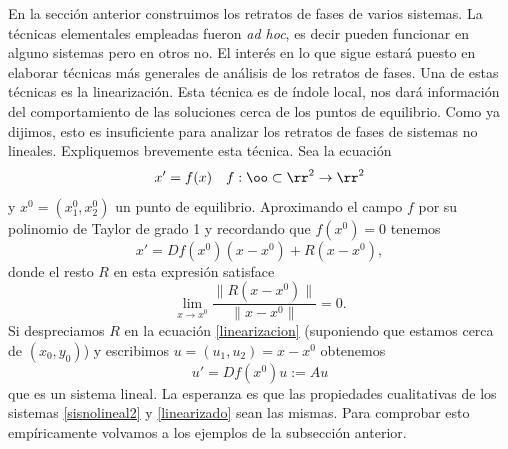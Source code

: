 En la sección anterior construimos los retratos de
fases de varios sistemas. La técnicas elementales empleadas fueron
\emph{ad hoc}, es decir pueden funcionar en alguno sistemas pero
en otros no. El interés en lo que sigue estará puesto en elaborar
técnicas más generales de análisis de los retratos de fases. Una
de estas técnicas es la linearización. Esta técnica es de índole
local, nos dará información del comportamiento de las soluciones
cerca de los puntos de equilibrio. Como ya dijimos, esto es
insuficiente para analizar los retratos de fases de sistemas no
lineales. Expliquemos brevemente esta técnica. Sea la ecuación
\begin{equation}\label{sisnolineal2}
x'=f(x)\quad f:\oo\subset\rr^2\to\rr^2
 \end{equation}
 y $x^0=(x_1^0,x_2^0)$ un punto de equilibrio. Aproximando el campo $f$
por su polinomio de Taylor de grado 1 y recordando que $f(x^0)=0$
tenemos
\begin{equation}\label{linearizacion}
    x'=Df(x^0)(x-x^0)+R(x-x^0),
\end{equation}
donde el resto $R$ en esta expresión satisface
\[
    \lim\limits_{x\to
    x^0}\frac{\|R(x-x^0)\|}{\|x-x^0\|}=0.
\]
Si despreciamos $R$ en la ecuación \eqref{linearizacion}
(suponiendo que estamos cerca de $(x_0,y_0)$) y escribimos
$u=(u_1,u_2)=x-x^0$ obtenemos
\begin{equation}\label{linearizado}
    u'=Df(x^0)u:=Au
\end{equation}
que es un sistema lineal. La esperanza es que las propiedades
cualitativas de los sistemas \eqref{sisnolineal2} y
\eqref{linearizado} sean las mismas. Para comprobar esto
empíricamente volvamos a los ejemplos de la subsección anterior.

